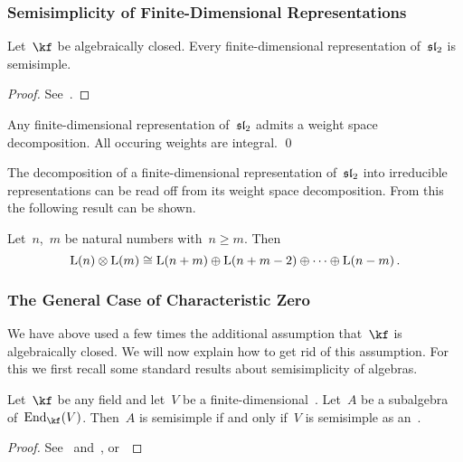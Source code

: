 \documentclass[a4paper, 11pt, oneside]{scrartcl}
\begin{document}
\subsubsection{Semisimplicity of Finite-Dimensional Representations}

\begin{theorem}[Weyl]
  Let~$\kf$ be algebraically closed.
  Every finite-dimensional representation of~$\mathfrak{sl}_2$ is semisimple.
\end{theorem}

\begin{proof}
  See~\cite[Theorem~6.3]{humphreys_lie_algebras}.
\end{proof}

\begin{corollary}
  Any finite-dimensional representation of~$\mathfrak{sl}_2$ admits a weight space decomposition.
  All occuring weights are integral.
  \qed
\end{corollary}

The decomposition of a finite-dimensional representation of~$\mathfrak{sl}_2$ into irreducible representations can be read off from its weight space decomposition.
From this the following result can be shown.

\begin{proposition}
  Let~$n$,~$m$ be natural numbers with~$n \geq m$.
  Then
  \[
    \operatorname{L}(n) \otimes \operatorname{L}(m)
    \cong
    \operatorname{L}(n + m) \oplus \operatorname{L}(n + m - 2) \oplus \dotsb \oplus \operatorname{L}(n - m) \,.
  \]
\end{proposition}

\subsubsection{The General Case of Characteristic Zero}

We have above used a few times the additional assumption that~$\kf$ is algebraically closed.
We will now explain how to get rid of this assumption.
For this we first recall some standard results about semisimplicity of algebras.

\begin{lemma}
  \label{semisimplicity via faithful representation}
  Let~$\kf$ be any field and let~$V$ be a finite-dimensional~\vectorspaces{$\kf$}.
  Let~$A$ be a subalgebra of~$\End_{\kf}(V)$.
  Then~$A$ is semisimple if and only if~$V$ is semisimple as an~.
\end{lemma}

\begin{proof}
  See~\cite[XVII,~\S5,~Proposition~4.7]{lang_algebra} and~\cite{stackexchange_lang_proof}, or~\cite[Proposition~5.13]{milne_lag}
\end{proof}
\end{document}

